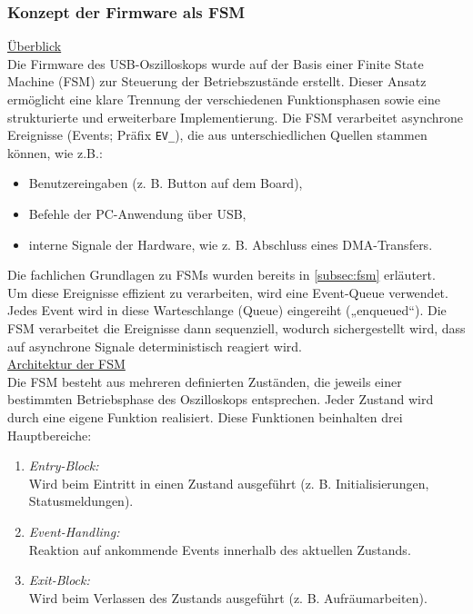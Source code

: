 \documentclass[a4paper, portrait, 12pt]{scrartcl} %
\begin{document}
\pagebreak

\subsubsection{Konzept der Firmware als FSM}

\underline{Überblick}\\
Die Firmware des USB-Oszilloskops wurde auf der Basis einer Finite State Machine (FSM) zur Steuerung der Betriebszustände erstellt. Dieser Ansatz ermöglicht eine klare Trennung der verschiedenen Funktionsphasen sowie eine strukturierte und erweiterbare Implementierung. Die FSM verarbeitet asynchrone Ereignisse (Events; Präfix \texttt{EV\_}), die aus unterschiedlichen Quellen stammen können, wie z.B.:

\begin{itemize}
	\item Benutzereingaben (z. B. Button auf dem Board),
	\item Befehle der PC-Anwendung über USB,
	\item interne Signale der Hardware, wie z. B. Abschluss eines DMA-Transfers.
\end{itemize}

Die fachlichen Grundlagen zu FSMs wurden bereits in \autoref{subsec:fsm} erläutert.\\

Um diese Ereignisse effizient zu verarbeiten, wird eine Event-Queue verwendet. Jedes Event wird in diese Warteschlange (Queue) eingereiht („enqueued“). Die FSM verarbeitet die Ereignisse dann sequenziell, wodurch sichergestellt wird, dass auf asynchrone Signale deterministisch reagiert wird.\\

\underline{Architektur der FSM}\\
Die FSM besteht aus mehreren definierten Zuständen, die jeweils einer bestimmten Betriebsphase des Oszilloskops entsprechen. Jeder Zustand wird durch eine eigene Funktion realisiert. Diese Funktionen beinhalten drei Hauptbereiche:

\begin{enumerate}
	\item \emph{Entry-Block:}\\
	Wird beim Eintritt in einen Zustand ausgeführt (z. B. Initialisierungen, Statusmeldungen).

	\item \emph{Event-Handling:}\\
	Reaktion auf ankommende Events innerhalb des aktuellen Zustands.

	\item \emph{Exit-Block:}\\
	Wird beim Verlassen des Zustands ausgeführt (z. B. Aufräumarbeiten).
\end{enumerate}
\end{document}
